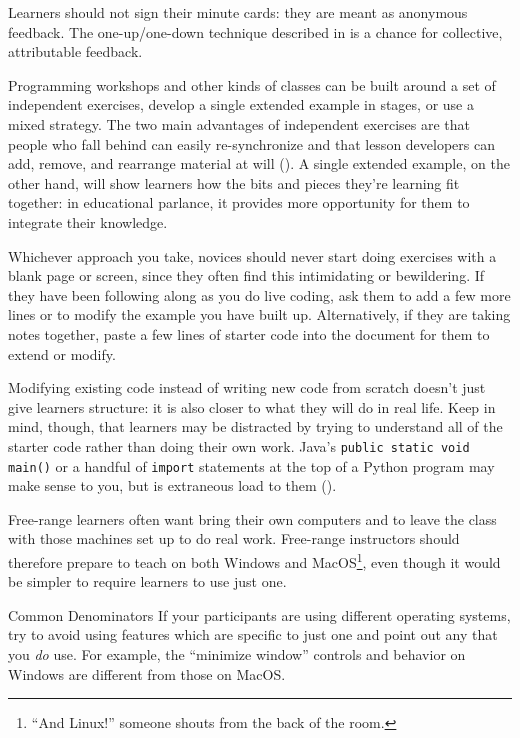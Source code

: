 Learners should not sign their minute cards:
they are meant as anonymous feedback.
The one-up/one-down technique described in 
is a chance for collective, attributable feedback.


Programming workshops and other kinds of classes
can be built around a set of independent exercises,
develop a single extended example in stages,
or use a mixed strategy.
The two main advantages of independent exercises are that
people who fall behind can easily re-synchronize
and that lesson developers can add, remove, and rearrange material at will
().
A single extended example,
on the other hand,
will show learners how the bits and pieces they're learning fit together:
in educational parlance,
it provides more opportunity for them to integrate their knowledge.

Whichever approach you take,
novices should never start doing exercises with a blank page or screen,
since they often find this intimidating or bewildering.
If they have been following along as you do live coding,
ask them to add a few more lines
or to modify the example you have built up.
Alternatively, if they are taking notes together,
paste a few lines of starter code into the document
for them to extend or modify.

Modifying existing code instead of writing new code from scratch
doesn't just give learners structure:
it is also closer to what they will do in real life.
Keep in mind,
though,
that learners may be distracted by trying to understand all of the starter code
rather than doing their own work.
Java's \texttt{public static void main()}
or a handful of \texttt{import} statements at the top of a Python program
may make sense to you,
but is extraneous load to them ().


Free-range learners often want bring their own computers
and to leave the class with those machines set up to do real work.
Free-range instructors should therefore prepare to teach on both Windows and MacOS\footnote{``And Linux!''
someone shouts from the back of the room.},
even though it would be simpler to require learners to use just one.

\begin{aside}{Common Denominators}
  If your participants are using different operating systems,
  try to avoid using features which are specific to just one
  and point out any that you \emph{do} use.
  For example,
  the ``minimize window'' controls and behavior on Windows are different
  from those on MacOS.
\end{aside}

